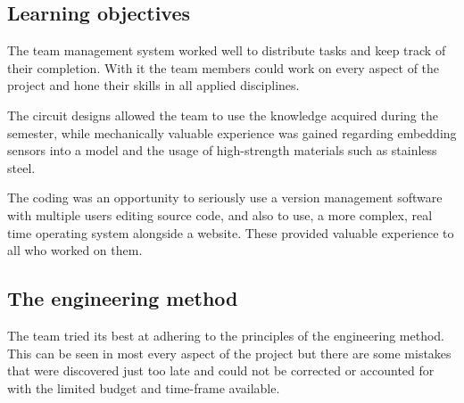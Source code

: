 \documentclass[report.tex]{subfiles}
\begin{document}
\subsection{Learning objectives}

The team management system worked well to distribute tasks and keep track of their completion. With it the team members could 
work on every aspect of the project and hone their skills in all applied disciplines.


The circuit designs allowed the team to use the knowledge acquired during the semester, while mechanically valuable experience
was gained regarding embedding sensors into a model and the usage of high-strength materials such as stainless steel.


The coding was an opportunity to seriously use a version management software with multiple users editing source code, and 
also to use, a more complex, real time operating system alongside a website. These provided valuable experience to all who worked on them.

\subsection{The engineering method}

The team tried its best at adhering to the principles of the engineering method. This can be seen in most every aspect of the project
but there are some mistakes that were discovered just too late and could not be corrected or accounted for with the limited budget and
time-frame available.
\end{document}
